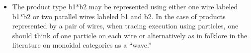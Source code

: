 \documentclass[preprint]{sigplanconf}
\begin{document}
\begin{itemize}
\item The product type {{b1*b2}} may be represented using either one wire
  labeled {{b1*b2}} or two parallel wires labeled {{b1}} and {{b2}}. In the
  case of products represented by a pair of wires, when tracing execution
  using particles, one should think of one particle on each wire or
  alternatively as in folklore in the literature on monoidal categories as a
  ``wave.''
\begin{multicols}{2}
\begin{center}
\end{center}
\begin{center}
\end{center}
\end{multicols}
\begin{multicols}{2}
\begin{center}
\end{center}
\begin{center}
\end{center}
\end{multicols}


\end{itemize}
\end{document}
